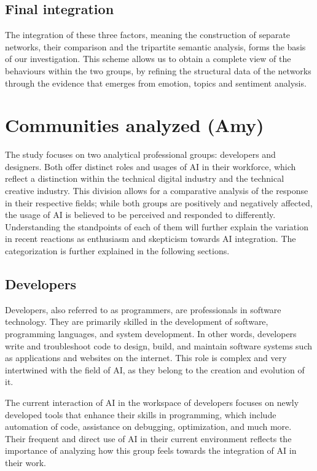 \documentclass[conference]{IEEEtran}
\begin{document}
\subsection{Final integration}
The integration of these three factors, meaning the construction of separate networks, their comparison and the tripartite semantic analysis, forms the basis of our investigation. This scheme allows us to obtain a complete view of the behaviours within the two groups, by refining the structural data of the networks through the evidence that emerges from emotion, topics and sentiment analysis.

\section{Communities analyzed (Amy)}
The study focuses on two analytical professional groups: developers and designers. Both offer distinct roles and usages of AI in their workforce, which reflect a distinction within the technical digital industry and the technical creative industry. This division allows for a comparative analysis of the response in their respective fields; while both groups are positively and negatively affected, the usage of AI is believed to be perceived and responded to differently. Understanding the standpoints of each of them will further explain the variation in recent reactions as enthusiasm and skepticism towards AI integration. The categorization is further explained in the following sections.

\subsection{Developers}
Developers, also referred to as programmers, are professionals in software technology. They are primarily skilled in the development of software, programming languages, and system development. In other words, developers write and troubleshoot code to design, build, and maintain software systems such as applications and websites on the internet. This role is complex and very intertwined with the field of AI, as they belong to the creation and evolution of it.

The current interaction of AI in the workspace of developers focuses on newly developed tools that enhance their skills in programming, which include automation of code, assistance on debugging, optimization, and much more. Their frequent and direct use of AI in their current environment reflects the importance of analyzing how this group feels towards the integration of AI in their work.
\end{document}
